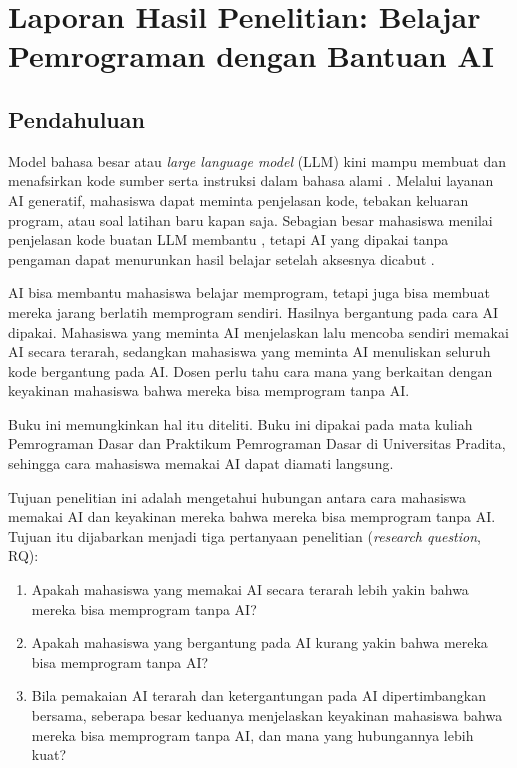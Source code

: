 \chapter{Laporan Hasil Penelitian: Belajar Pemrograman dengan Bantuan AI}
\label{chap:penelitian}

\section{Pendahuluan}
\label{sec:b16-pendahuluan}

Model bahasa besar atau \textit{large language model} (LLM) kini mampu membuat dan menafsirkan kode sumber serta instruksi dalam bahasa alami \cite{prather2023}. Melalui layanan AI generatif, mahasiswa dapat meminta penjelasan kode, tebakan keluaran program, atau soal latihan baru kapan saja. Sebagian besar mahasiswa menilai penjelasan kode buatan LLM membantu \cite{macneil2023}, tetapi AI yang dipakai tanpa pengaman dapat menurunkan hasil belajar setelah aksesnya dicabut \cite{bastani2025}.

AI bisa membantu mahasiswa belajar memprogram, tetapi juga bisa membuat mereka jarang berlatih memprogram sendiri. Hasilnya bergantung pada cara AI dipakai. Mahasiswa yang meminta AI menjelaskan lalu mencoba sendiri memakai AI secara terarah, sedangkan mahasiswa yang meminta AI menuliskan seluruh kode bergantung pada AI. Dosen perlu tahu cara mana yang berkaitan dengan keyakinan mahasiswa bahwa mereka bisa memprogram tanpa AI.

Buku ini memungkinkan hal itu diteliti. Buku ini dipakai pada mata kuliah Pemrograman Dasar dan Praktikum Pemrograman Dasar di Universitas Pradita, sehingga cara mahasiswa memakai AI dapat diamati langsung.

Tujuan penelitian ini adalah mengetahui hubungan antara cara mahasiswa memakai AI dan keyakinan mereka bahwa mereka bisa memprogram tanpa AI. Tujuan itu dijabarkan menjadi tiga pertanyaan penelitian (\textit{research question}, RQ):

\begin{enumerate}
  \item[RQ1.] Apakah mahasiswa yang memakai AI secara terarah lebih yakin bahwa mereka bisa memprogram tanpa AI?
  \item[RQ2.] Apakah mahasiswa yang bergantung pada AI kurang yakin bahwa mereka bisa memprogram tanpa AI?
  \item[RQ3.] Bila pemakaian AI terarah dan ketergantungan pada AI dipertimbangkan bersama, seberapa besar keduanya menjelaskan keyakinan mahasiswa bahwa mereka bisa memprogram tanpa AI, dan mana yang hubungannya lebih kuat?
\end{enumerate}

